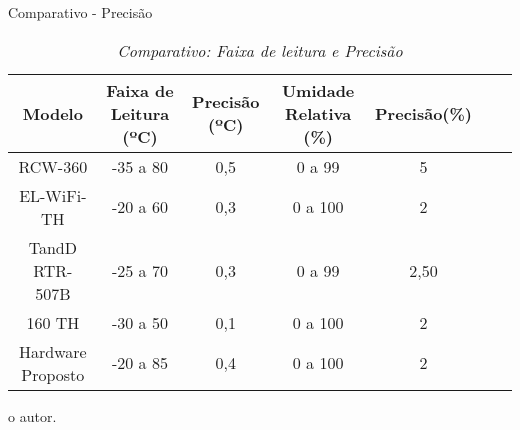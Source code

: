 \begin{frame}{Comparativo - Precisão}


\begin{table}[!h]
	
	\captionsetup{width=9cm}%
	\caption{\label{tab:compara_precisao} \textit{Comparativo: Faixa de leitura e Precisão}}%
	
		\begin{tabular}{ccccccc}
			\toprule
			Modelo & Faixa de Leitura (ºC) & Precisão (ºC) & Umidade Relativa (\%) & Precisão(\%)\\
			\midrule \midrule
           RCW-360           & -35 a 80      & 0,5 & 0 a 99 & 5    \\
           EL-WiFi-TH        & -20 a 60      & 0,3 & 0 a 100 & 2    \\
           TandD RTR-507B    & -25 a 70      & 0,3 & 0 a 99  & 2,50 \\
           160 TH            & -30 a 50      & 0,1 & 0 a 100 & 2 \\
           Hardware Proposto & -20 a 85      & 0,4 & 0 a 100 & 2\\
	    \bottomrule
		\end{tabular}%

	\tiny{o autor.}%

    \end{table}

    
\end{frame}






